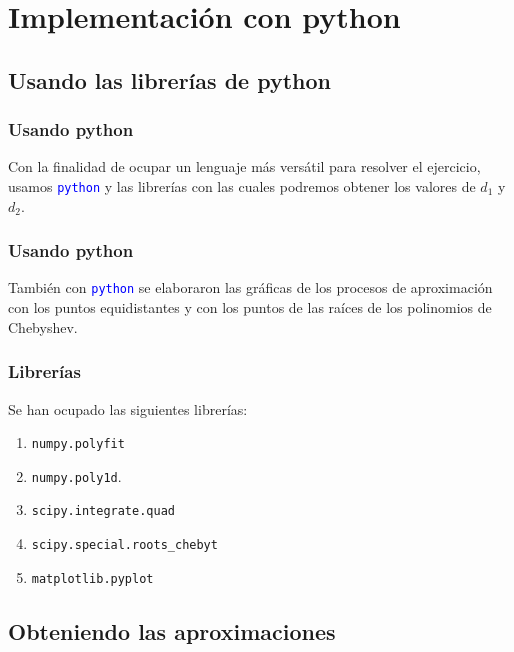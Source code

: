\documentclass[12pt]{beamer}
\begin{document}
\section{Implementación con python}
\subsection{Usando las librerías de python}

\begin{frame}
\frametitle{Usando python}
Con la finalidad de ocupar un lenguaje más versátil para resolver el ejercicio, usamos \textcolor{blue}{\texttt{python}} y las librerías con las cuales podremos obtener los valores de $d_{1}$ y $d_{2}$.
\end{frame}
\begin{frame}
\frametitle{Usando python}    
También con \textcolor{blue}{\texttt{python}} se elaboraron las gráficas de los procesos de aproximación con los puntos equidistantes y con los puntos de las raíces de los polinomios de Chebyshev.
\end{frame}
\begin{frame}
\frametitle{Librerías}
Se han ocupado las siguientes librerías:
\begin{enumerate}[<+->]
\item \texttt{numpy.polyfit} 
\item \texttt{numpy.poly1d}.
\item \texttt{scipy.integrate.quad}
\item \texttt{scipy.special.roots\_chebyt}
\item \texttt{matplotlib.pyplot}
\end{enumerate}
\end{frame}

\subsection{Obteniendo las aproximaciones}
\end{document}
